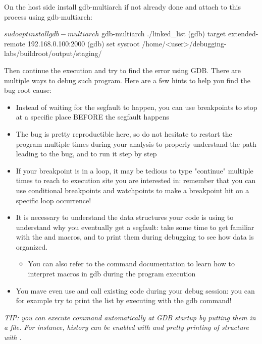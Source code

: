 
On the host side install gdb-multiarch if not already done and attach to this
process using gdb-multiarch:

\begin{bashinput}
$ sudo apt install gdb-multiarch
$ gdb-multiarch ./linked_list
(gdb) target extended-remote 192.168.0.100:2000
(gdb) set sysroot /home/<user>/debugging-labs/buildroot/output/staging/
\end{bashinput}

Then continue the execution and try to find the error using GDB. There are
multiple ways to debug such program. Here are a few hints to help you find the bug root
cause:
\begin{itemize}
  \item Instead of waiting for the segfault to happen, you can use breakpoints
  to stop at a specific place BEFORE the segfault happens
  \item The bug is pretty reproductible here, so do not hesitate to restart the
  program multiple times during your analysis to properly understand the path
  leading to the bug, and to run it step by step
  \item If your breakpoint is in a loop, it may be tedious to type "continue"
  multiple times to reach to execution site you are interested in: remember
  that you can use conditional breakpoints and watchpoints to make a breakpoint
  hit on a specific loop occurrence!
  \item It is necessary to understand the data structures your code is using to
  understand why you eventually get a segfault: take some time to get familiar
  with the  and  macros, and to print them
  during debugging to see how data is organized.
  \begin{itemize}
    \item You can also refer to the  command documentation to learn
    how to interpret macros in gdb during the program execution
  \end{itemize}
  \item You mave even use and call existing code during your debug session: you
  can for example try to print the list by executing
   with the  gdb command!
\end{itemize}

{\em TIP: you can execute command automatically at GDB startup by putting them
in a  file. For instance, history can be enabled with
 and pretty printing of structure with
.}

